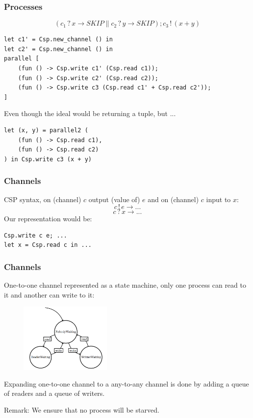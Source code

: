 \documentclass{beamer}
\newcommand{\green}[1] {\textcolor{kugreen}{#1}}
\begin{document}
\begin{frame}[fragile]
  \frametitle{Processes}
    \[(c_1\,?\,x \to SKIP \parallel c_2\,?\,y \to SKIP); c_3\,!\,(x + y)\]
\scriptsize
\begin{verbatim}
let c1' = Csp.new_channel () in
let c2' = Csp.new_channel () in
parallel [
    (fun () -> Csp.write c1' (Csp.read c1));
    (fun () -> Csp.write c2' (Csp.read c2));
    (fun () -> Csp.write c3 (Csp.read c1' + Csp.read c2'));
]
\end{verbatim}
\normalsize
Even though the ideal would be returning a tuple, but ...
\scriptsize
\begin{verbatim}
let (x, y) = parallel2 (
    (fun () -> Csp.read c1), 
    (fun () -> Csp.read c2)
) in Csp.write c3 (x + y)
\end{verbatim}
\normalsize
\end{frame}


\begin{frame}[fragile]
  \frametitle{Channels}
  CSP syntax, on (channel) $c$ output (value of) $e$ and on (channel) $c$ input
  to $x$:
    \[c\,!\,e \to ...\]
    \[c\,?\,x \to ...\]
  Our representation would be:
\scriptsize
\begin{verbatim}
Csp.write c e; ...
let x = Csp.read c in ...
\end{verbatim}
\normalsize
\end{frame}

\begin{frame}
  \frametitle{Channels}
  One-to-one channel represented as a state machine, only one process can read
  to it and another can write to it:
  \begin{figure}[htp]
    \begin{center}
      \includegraphics[width=4.5cm,keepaspectratio=true]{figures/channels.png}
    \end{center}
  \end{figure}
  Expanding one-to-one channel to a any-to-any channel is done by adding a queue
  of readers and a queue of writers.

  \green{Remark:} We ensure that no process will be starved. 
\end{frame}
\end{document}
